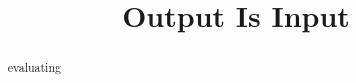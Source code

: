 \documentclass{ximera}
\title{Output Is Input}
\begin{document}
\begin{abstract}
evaluating
\end{abstract}
\maketitle
\end{document}
